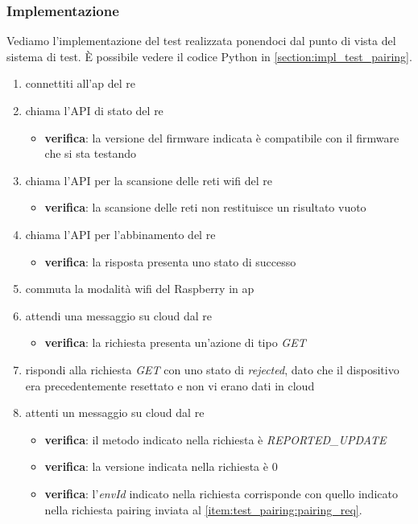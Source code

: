 \documentclass[12pt,a4paper,twoside,titlepage]{book}
\begin{document}
\subsubsection{Implementazione}

Vediamo l'implementazione del test realizzata ponendoci dal punto di vista del sistema di test. 
È possibile vedere il codice Python in \autoref{section:impl_test_pairing}.

\begin{enumerate}
    \item connettiti all'\acrshort{ap} del \acrshort{re}
    \item chiama l'API di stato del \acrshort{re}
    \begin{itemize}
        \item \textbf{verifica}: la versione del \gls{firmware} indicata è compatibile con il \gls{firmware} 
            che si sta testando 
    \end{itemize}
    \item chiama l'API per la scansione delle reti \Gls{wifi} del \acrshort{re}
    \begin{itemize}
        \item \textbf{verifica}: la scansione delle reti non restituisce un risultato vuoto 
    \end{itemize}
    \item chiama l'API per l'abbinamento del \acrshort{re} \label{item:test_pairing:pairing_req}
    \begin{itemize}
        \item \textbf{verifica}: la risposta presenta uno stato di successo 
    \end{itemize}
    \item commuta la modalità \Gls{wifi} del Raspberry in \acrshort{ap}
    \item attendi una messaggio su cloud dal \acrshort{re}
    \begin{itemize}
        \item \textbf{verifica}: la richiesta presenta un'azione di tipo \textit{GET}
    \end{itemize}
    \item rispondi alla richiesta \textit{GET} con uno stato di \textit{rejected}, dato che 
        il dispositivo era precedentemente resettato e non vi erano dati in cloud
    \item attenti un messaggio su cloud dal \acrshort{re}
    \begin{itemize}
        \item \textbf{verifica}: il metodo indicato nella richiesta è \textit{REPORTED\_UPDATE}
        \item \textbf{verifica}: la versione indicata nella richiesta è 0
        \item \textbf{verifica}: l'\textit{envId} indicato nella richiesta corrisponde con quello 
            indicato nella richiesta pairing inviata al \autoref{item:test_pairing:pairing_req}.
    \end{itemize}
\end{enumerate}
\end{document}
